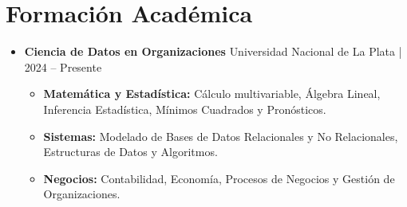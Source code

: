 \documentclass[11pt, a4paper]{article}
\newcommand{\schoolHeader}[2]{
    \textbf{#1} \hfill {\footnotesize \color{accent} #2}
}
\begin{document}
\section*{Formación Académica}
\begin{itemize}[leftmargin=*]
    \item \schoolHeader{Ciencia de Datos en Organizaciones}{Universidad Nacional de La Plata | 2024 -- Presente}
    \begin{itemize}[label=\tiny\faChevronRight]
        \item \textbf{Matemática y Estadística:} Cálculo multivariable, Álgebra Lineal, Inferencia Estadística, Mínimos Cuadrados y Pronósticos.
        \item \textbf{Sistemas:} Modelado de Bases de Datos Relacionales y No Relacionales, Estructuras de Datos y Algoritmos.
        \item \textbf{Negocios:} Contabilidad, Economía, Procesos de Negocios y Gestión de Organizaciones.
    \end{itemize}
\end{itemize}
\end{document}
